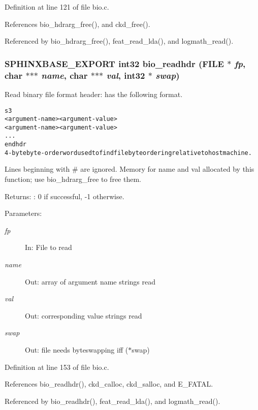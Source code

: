 Definition at line 121 of file bio.c.

References bio\_\-hdrarg\_\-free(), and ckd\_\-free().

Referenced by bio\_\-hdrarg\_\-free(), feat\_\-read\_\-lda(), and logmath\_\-read().
\subsubsection[{bio\_\-readhdr}]{\setlength{\rightskip}{0pt plus 5cm}SPHINXBASE\_\-EXPORT int32 bio\_\-readhdr (FILE $\ast$ {\em fp}, \/  char $\ast$$\ast$$\ast$ {\em name}, \/  char $\ast$$\ast$$\ast$ {\em val}, \/  int32 $\ast$ {\em swap})}\label{bio_8h_7a155ff51740f1d9a31f7bb7b6e4bc3a}


Read binary file format header: has the following format. 

\small\begin{alltt}
     s3
     <argument-name> <argument-value>
     <argument-name> <argument-value>
     ...
     endhdr
     4-byte byte-order word used to find file byte ordering relative to host machine.
 \end{alltt}
\normalsize 
 Lines beginning with \# are ignored. Memory for name and val allocated by this function; use bio\_\-hdrarg\_\-free to free them. \begin{Desc}
\item[Returns:]: 0 if successful, -1 otherwise. \end{Desc}
\begin{Desc}
\item[Parameters: ]\par
\begin{description}
\item[{\em 
fp}]In: File to read \item[{\em 
name}]Out: array of argument name strings read \item[{\em 
val}]Out: corresponding value strings read \item[{\em 
swap}]Out: file needs byteswapping iff ($\ast$swap) \end{description}
\end{Desc}


Definition at line 153 of file bio.c.

References bio\_\-readhdr(), ckd\_\-calloc, ckd\_\-salloc, and E\_\-FATAL.

Referenced by bio\_\-readhdr(), feat\_\-read\_\-lda(), and logmath\_\-read().
